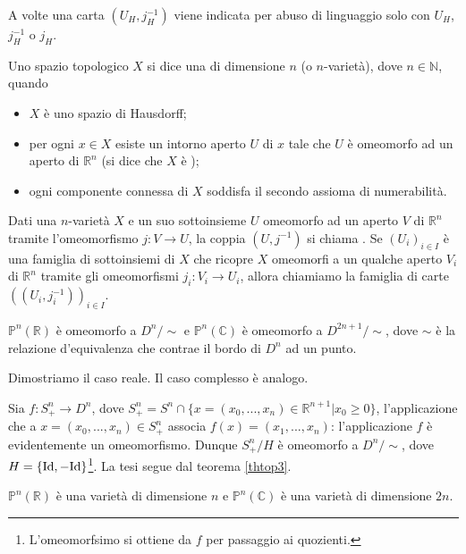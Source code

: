 	\par A volte una carta $(U_H, j_H^{-1})$ viene indicata per abuso di linguaggio solo con $U_H$, $j_H^{-1}$ o $j_H$.
\begin{Definition}\label{deftop3}
	Uno spazio topologico $X$ si dice una  di dimensione $n$ (o $n$-variet\`a), dove $n \in \mathbb{N}$, quando
	\begin{itemize}
		\item $X$ \`e uno spazio di Hausdorff;
		\item per ogni $x \in X$ esiste un intorno aperto $U$ di $x$ tale che $U$ \`e omeomorfo ad un aperto di $\mathbb{R}^n$ (si dice che $X$ \`e );
		\item ogni componente connessa di $X$ soddisfa il secondo assioma di numerabilit\`a.
	\end{itemize}
\end{Definition}
\begin{Definition}\label{deftop4}
	Dati una $n$-variet\`a $X$ e un suo sottoinsieme $U$ omeomorfo ad un aperto $V$ di $\mathbb{R}^n$ tramite l'omeomorfismo $j: V \rightarrow U$, la coppia $(U,j^{-1})$ si chiama . Se $(U_i)_{i \in I}$ \`e una famiglia di sottoinsiemi di $X$ che ricopre $X$ omeomorfi a un qualche aperto $V_i$ di $\mathbb{R}^n$ tramite gli omeomorfismi $j_i: V_i \rightarrow U_i$, allora chiamiamo  la famiglia di carte $((U_i,j_i^{-1}))_{i \in I}$.
\end{Definition}
\begin{Theorem}\label{thtop5-1}
	$\mathbb{P}^n(\mathbb{R})$ \`e omeomorfo a $D^n/\sim$ e $\mathbb{P}^n(\mathbb{C})$ \`e omeomorfo a $D^{2n + 1}/\sim$, dove $\sim$ \`e la relazione d'equivalenza che contrae il bordo di $D^n$ ad un punto.
\end{Theorem}
\Proof Dimostriamo il caso reale. Il caso complesso \`e analogo.
\par Sia $f: S^n_+ \rightarrow D^n$, dove $S^n_+ = S^n \cap \lbrace x = (x_0, ..., x_n) \in \mathbb{R}^{n + 1} | x_0 \geq 0 \rbrace$, l'applicazione che a $x = (x_0, ..., x_n) \in S^n_+$ associa $f(x) = (x_1, ..., x_n)$: l'applicazione $f$ \`e evidentemente un omeomorfismo. Dunque $S^n_+/H$ \`e omeomorfo a $D^n/\sim$, dove $H = \lbrace \Identity, - \Identity \rbrace$\footnote{L'omeomorfsimo si ottiene da $f$ per passaggio ai quozienti.}. La tesi segue dal teorema \ref{thtop3}. \EndProof
\begin{Theorem}\label{thtop5}
	$\mathbb{P}^n(\mathbb{R})$ \`e una variet\`a di dimensione $n$ e $\mathbb{P}^n(\mathbb{C})$ \`e una variet\`a di dimensione $2n$.
\end{Theorem}
